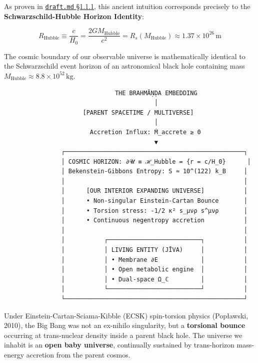 \documentclass[11pt,a4paper]{article}
\theoremstyle{definition}
\theoremstyle{remark}
\begin{document}
As proven in \href{draft.md\#L58-L70}{\texttt{draft.md} \S 1.1.1}, this ancient intuition corresponds precisely to the \textbf{Schwarzschild-Hubble Horizon Identity}:


\begin{equation}
\boxed{R_{\text{Hubble}} \equiv \frac{c}{H_0} = \frac{2 G M_{\text{Hubble}}}{c^2} = R_s(M_{\text{Hubble}}) \approx 1.37 \times 10^{26} \, \mathrm{m}}
\end{equation}


The cosmic boundary of our observable universe is mathematically identical to the Schwarzschild event horizon of an astronomical black hole containing mass $M_{\text{Hubble}} \approx 8.8 \times 10^{52} \, \mathrm{kg}$.

\begin{verbatim}
                               THE BRAHMĀṆḌA EMBEDDING
                                          │
                      [PARENT SPACETIME / MULTIVERSE]
                                          │
                        Accretion Influx: Ṁ_accrete ≥ 0
                                          ▼
                ┌──────────────────────────────────────────────────┐
                │ COSMIC HORIZON: ∂𝓤 ≡ ℋ_Hubble = {r = c/H_0}      │
                │ Bekenstein-Gibbons Entropy: S ≈ 10^(122) k_B     │
                │                                                  │
                │      [OUR INTERIOR EXPANDING UNIVERSE]           │
                │      • Non-singular Einstein-Cartan Bounce       │
                │      • Torsion stress: -1/2 κ² s_μνρ s^μνρ       │
                │      • Continuous negentropy accretion           │
                │                                                  │
                │           ┌──────────────────────────┐           │
                │           │ LIVING ENTITY (JĪVA)     │           │
                │           │ • Membrane ∂E            │           │
                │           │ • Open metabolic engine  │           │
                │           │ • Dual-space Ω_ℂ         │           │
                │           └──────────────────────────┘           │
                └──────────────────────────────────────────────────┘
\end{verbatim}

Under Einstein-Cartan-Sciama-Kibble (ECSK) spin-torsion physics (Popławski, 2010), the Big Bang was not an ex-nihilo singularity, but a \textbf{torsional bounce} occurring at trans-nuclear density inside a parent black hole. The universe we inhabit is an \textbf{open baby universe}, continually sustained by trans-horizon mass-energy accretion from the parent cosmos.
\end{document}
